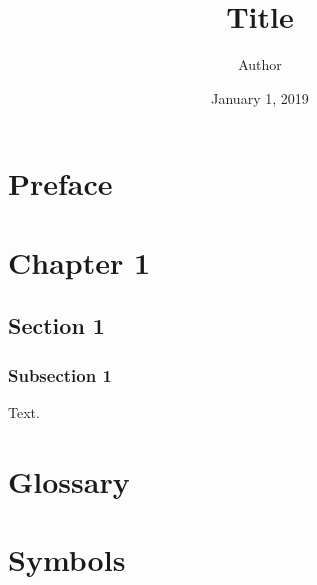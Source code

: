 \documentclass{book}
\begin{document}
\frontmatter
\title{Title}
\author{Author}
\date{January 1, 2019}
\maketitle
\tableofcontents
\chapter{Preface}
\mainmatter
\chapter{Chapter 1}
\section{Section 1}
\subsection{Subsection 1}
Text.
\blindtext[3]
\backmatter
\appendix
\cleardoublepage
{}
\chapter{Glossary}
\chapter{Symbols}
% 
\nocite{*}

% 
\clearpage
{}
\printindex
\end{document}

